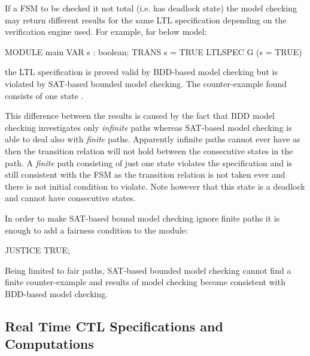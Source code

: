 If a FSM to be checked it not total (i.e. has deadlock state) the
model checking may return different results for the same LTL
specification depending on the verification engine used.  For
example, for below model:
%
\begin{nusmvCode}
MODULE main
VAR s : boolean;
TRANS s = TRUE
LTLSPEC G (s = TRUE)
\end{nusmvCode}
%
the LTL specification is proved valid by BDD-based model checking but
is violated by SAT-based bounded model checking. The counter-example
found consists of one state .

This difference between the results is caused by the fact that BDD
model checking investigates only \emph{infinite} paths whereas
SAT-based model checking is able to deal also with
\emph{finite} paths.
%
Apparently infinite paths cannot ever have  as then the
transition relation will not hold between the consecutive states in
the path.
%
A \emph{finite} path consisting of just one state 
violates the specification  and is still consistent
with the FSM as the transition relation is not taken ever and there is
not initial condition to violate. Note however that this state is a
deadlock and cannot have consecutive states.

In order to make SAT-based bound model checking ignore finite paths
it is enough to add a fairness condition to the  module:
%
\begin{nusmvCode}
JUSTICE TRUE;
\end{nusmvCode}
%
Being limited to fair paths, SAT-based bounded model checking cannot
find a finite counter-example and results of model checking become
consistent with BDD-based model checking.

\subsection{Real Time CTL Specifications and Computations}
\label{Real Time CTL Specifications and Computations}

